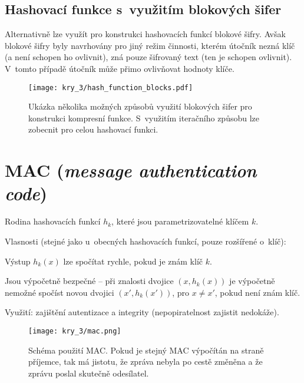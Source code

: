 \subsection*{Hashovací funkce s~využitím blokových šifer}

Alternativně lze využít pro konstrukci hashovacích funkcí blokové šifry. Avšak blokové šifry byly navrhovány pro jiný režim činnosti, kterém útočník nezná klíč (a není schopen ho ovlivnit), zná pouze šifrovaný text (ten je schopen ovlivnit). V~tomto případě útočník může přimo ovlivňovat hodnoty klíče.

\begin{figure}[H]
    \centering
    \texttt{[image: kry\_3/hash\_function\_blocks.pdf]}
    \caption{Ukázka několika možných způsobů využití blokových šifer pro konstrukci kompresní funkce. S~využitím iteračního způsobu lze zobecnit pro celou hashovací funkci.}
\end{figure}


\section{MAC (\textit{message authentication code})}

\begin{compactitem}
    \item Rodina hashovacích funkcí $h_k$, které jsou parametrizovatelné klíčem $k$.
    \item Vlasnosti (stejné jako u~obecných hashovacích funkcí, pouze rozšířené o~klíč): \begin{compactitem}
        \item Výstup $h_k(x)$ lze spočítat rychle, pokud je znám klíč $k$.
        \item Jsou výpočetně bezpečné -- při znalosti dvojice $(x, h_k(x))$ je výpočetně nemožné spočíst novou dvojici $(x', h_k(x'))$, pro $x \neq x'$, pokud není znám klíč.
    \end{compactitem}
    \item Využití: zajištění autentizace a integrity (nepopiratelnost zajistit nedokáže).
\end{compactitem}

\begin{figure}[H]
    \centering
    \texttt{[image: kry\_3/mac.png]}
    \caption{Schéma použití MAC. Pokud je stejný MAC výpočítán na straně příjemce, tak má jistotu, že zpráva nebyla po cestě změněna a že zprávu poslal skutečně odesílatel.}
\end{figure}

